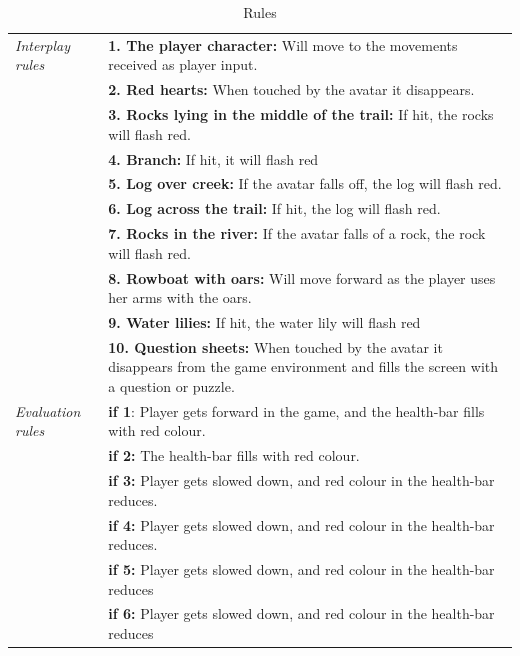 \begin{table}
\centering
\begin{tabular}{|p{}|p{}|}
\hline
\emph{Interplay rules} & \textbf{1. The player character:} Will move to the movements received as player input. \\ \cline{2-2}
&  \textbf{2. Red hearts:} When touched by the avatar it disappears. \\ \cline{2-2}
& \textbf{3. Rocks lying in the middle of the trail:} If hit, the  rocks will flash red.  \\ \cline{2-2}
&  \textbf{4. Branch:} If hit, it will flash red \\ \cline{2-2}
& \textbf{5. Log over creek:} If the avatar falls off, the log will flash red. \\ \cline{2-2}
& \textbf{6. Log across the trail:} If hit, the log will flash red.  \\ \cline{2-2}
& \textbf{7. Rocks in the river:} If the avatar falls of a rock, the rock will flash red.  \\ \cline{2-2}
& \textbf{8. Rowboat with oars:} Will move forward as the player uses her arms with the oars. \\ \cline{2-2}
& \textbf{9. Water lilies:} If hit, the water lily will flash red \\ \cline{2-2}
&  \textbf{10. Question sheets:} When touched by the avatar  it  disappears from the game environment and fills the screen with  a  question or puzzle. \\ \hline
\emph{Evaluation rules} & \textbf{if 1}: Player gets forward in the game, and the health-bar fills with red colour. \\ \cline{2-2}
& \textbf{if 2:} The health-bar fills with red colour.  \\ \cline{2-2}
& \textbf{if 3:} Player gets slowed down, and red colour in the health-bar reduces.   \\ \cline{2-2}
& \textbf{if 4:} Player gets slowed down, and red colour in the health-bar reduces.  \\ \cline{2-2}
& \textbf{if 5:} Player gets slowed down, and red colour in the health-bar reduces   \\ \cline{2-2}
& \textbf{if 6:} Player gets slowed down, and red colour in the health-bar reduces   \\ \hline
\end{tabular}
\caption[Rules in the "Nature Trail" game]{Rules}
\label{tab:rules1}
\end{table} 

